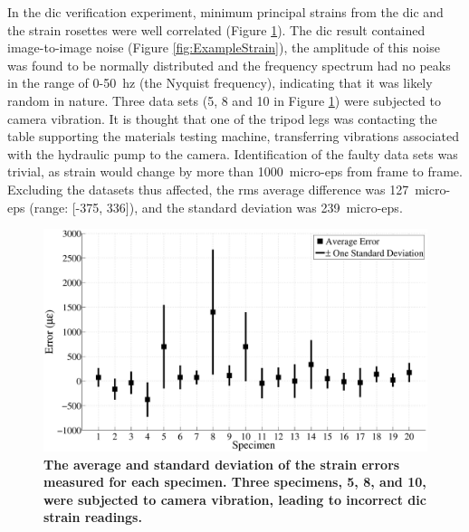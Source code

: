 In the \ac{dic} verification experiment, minimum principal strains from the \ac{dic} and the strain rosettes were well correlated (Figure \ref{fig:StrainErrors}).
The \ac{dic} result contained image-to-image noise (Figure \ref{fig:ExampleStrain}), the amplitude of this noise was found to be normally distributed and the frequency spectrum had no peaks in the range of 0-50~\ac{hz} (the Nyquist frequency), indicating that it was likely random in nature.
Three data sets (5, 8 and 10 in Figure \ref{fig:StrainErrors}) were subjected to camera vibration.
It is thought that one of the tripod legs was contacting the table supporting the materials testing machine, transferring vibrations associated with the hydraulic pump to the camera.
Identification of the faulty data sets was trivial, as strain would change by more than 1000~\ac{micro-eps} from frame to frame.
Excluding the datasets thus affected, the \ac{rms} average difference was 127~\ac{micro-eps} (range: [-375, 336]), and the standard deviation was 239~\ac{micro-eps}.

\begin{figure}
	\centering
	\includegraphics[width=1\linewidth]{./impactor/figures/StrainError.eps}
	\caption[Validation of \acf*{dic} on the femoral neck]{\textbf{The average and standard deviation of the strain errors measured for each specimen.
	Three specimens, 5, 8, and 10, were subjected to camera vibration, leading to incorrect \ac{dic} strain readings.}}
	\label{fig:StrainErrors}
\end{figure}

